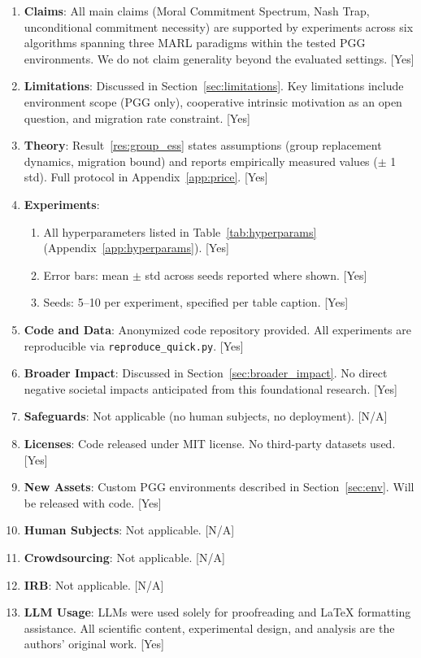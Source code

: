 \documentclass{article}
\begin{document}
\begin{enumerate}
\item \textbf{Claims}: All main claims (Moral Commitment Spectrum, Nash Trap, unconditional commitment necessity) are supported by experiments across six algorithms spanning three MARL paradigms within the tested PGG environments. We do not claim generality beyond the evaluated settings. [Yes]
\item \textbf{Limitations}: Discussed in Section~\ref{sec:limitations}. Key limitations include environment scope (PGG only), cooperative intrinsic motivation as an open question, and migration rate constraint. [Yes]
\item \textbf{Theory}: Result~\ref{res:group_ess} states assumptions (group replacement dynamics, migration bound) and reports empirically measured values ($\pm$ 1 std). Full protocol in Appendix~\ref{app:price}. [Yes]
\item \textbf{Experiments}:
  \begin{enumerate}
    \item All hyperparameters listed in Table~\ref{tab:hyperparams} (Appendix~\ref{app:hyperparams}). [Yes]
    \item Error bars: mean $\pm$ std across seeds reported where shown. [Yes]
    \item Seeds: 5--10 per experiment, specified per table caption. [Yes]
  \end{enumerate}
\item \textbf{Code and Data}: Anonymized code repository provided. All experiments are reproducible via \texttt{reproduce\_quick.py}. [Yes]
\item \textbf{Broader Impact}: Discussed in Section~\ref{sec:broader_impact}. No direct negative societal impacts anticipated from this foundational research. [Yes]
\item \textbf{Safeguards}: Not applicable (no human subjects, no deployment). [N/A]
\item \textbf{Licenses}: Code released under MIT license. No third-party datasets used. [Yes]
\item \textbf{New Assets}: Custom PGG environments described in Section~\ref{sec:env}. Will be released with code. [Yes]
\item \textbf{Human Subjects}: Not applicable. [N/A]
\item \textbf{Crowdsourcing}: Not applicable. [N/A]
\item \textbf{IRB}: Not applicable. [N/A]
\item \textbf{LLM Usage}: LLMs were used solely for proofreading and LaTeX formatting assistance. All scientific content, experimental design, and analysis are the authors' original work. [Yes]
\end{enumerate}
\end{document}
